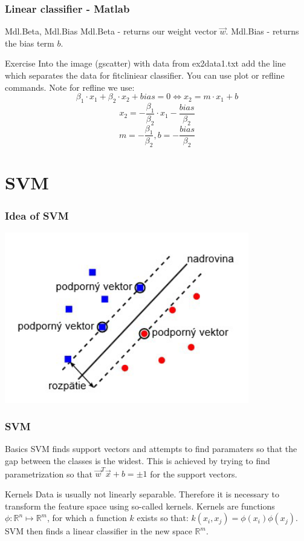 \documentclass{beamer}
\begin{document}
\begin{frame}
\frametitle{Linear classifier - Matlab}
\begin{block}{Mdl.Beta, Mdl.Bias}
Mdl.Beta - returns our weight vector $\vec{w}$. Mdl.Bias - returns the bias term $b$.
\end{block}


\begin{block}{Exercise}
Into the image (gscatter) with data from ex2data1.txt add the line which separates the data for fitcliniear classifier. You can use plot or refline commands. Note for refline we use:
$$\beta_1 \cdot x_1 + \beta_2 \cdot x_2 + bias = 0 \iff  x_2 = m \cdot x_1 + b $$
$$x_2 = -\frac{\beta_1}{\beta_2} \cdot x_1 - \frac{bias}{\beta_2}$$
$$ m = -\frac{\beta_1}{\beta_2}, b = - \frac{bias}{\beta_2}$$
\end{block}
\end{frame}

\section{SVM}

\begin{frame}
\frametitle{Idea of SVM}
\center
\includegraphics[width=0.8\textwidth]{svm.png}
\end{frame}

\begin{frame}
\frametitle{SVM}
\begin{block}{Basics}
SVM finds support vectors and attempts to find paramaters so that the gap between the classes is the widest. This is achieved by trying to find parametrization so that $\vec{w}^T \vec{x} + b = \pm 1$ for the support vectors.
\end{block}

\begin{block}{Kernels}
Data is usually not linearly separable. Therefore it is necessary to transform the feature space using so-called kernels. Kernels are functions $\phi : \mathbb{R}^n \mapsto \mathbb{R}^{m}$, for which a function $k$ exists so that: $k(x_i, x_j) = \phi(x_i) \phi(x_j).$ SVM then finds a linear classifier in the new space  $\mathbb{R}^m$.
\end{block}
\end{frame}
\end{document}
